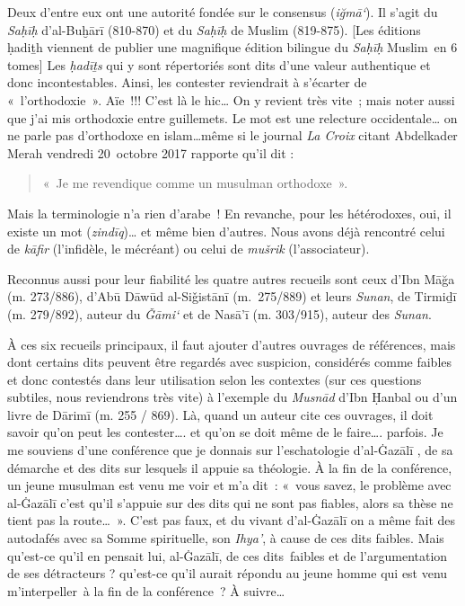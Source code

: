 Deux d'entre eux ont une autorité fondée sur le consensus
(\emph{iğmā`}). Il s'agit du \emph{Saḥīḥ} d'al-Buḫārī (810-870) et du
\emph{Saḥīḥ} de Muslim (819-875). {[}Les éditions ḥadiṯh viennent de
publier une magnifique édition bilingue du \emph{Saḥīḥ} Muslim~en 6
tomes{]} Les \emph{ḥadīṯs} qui y sont répertoriés sont dits d'une valeur
authentique et donc incontestables. Ainsi, les contester reviendrait à
s'écarter de «~l'orthodoxie~». Aïe~!!! C'est là le hic\ldots{} On y
revient très vite~; mais noter aussi que j'ai mis orthodoxie entre
guillemets. Le mot est une relecture occidentale\ldots{} on ne parle pas
d'orthodoxe en islam\ldots même si le journal \emph{La Croix} citant
Abdelkader Merah vendredi 20~octobre 2017 rapporte qu'il dit :
\begin{quote}
    «~Je me revendique comme un musulman orthodoxe~».
\end{quote}
 Mais la
terminologie n'a rien d'arabe~! En revanche, pour les hétérodoxes, oui,
il existe un mot (\emph{zindīq})\ldots{} et même bien d'autres. Nous
avons déjà rencontré celui de \emph{kāfir} (l'infidèle, le mécréant) ou
celui de \emph{mušrik} (l'associateur).

Reconnus aussi pour leur fiabilité les quatre autres recueils sont ceux
d'Ibn Māğa (m. 273/886), d'Abū Dāwūd al-Siǧistānī (m.~275/889) et leurs
\emph{Sunan}, de Tirmiḏī (m. 279/892), auteur du \emph{Ǧāmi`} et de
Nasā'ī (m. 303/915), auteur des \emph{Sunan}.

À ces six recueils principaux, il faut ajouter d'autres ouvrages de
références, mais dont certains dits peuvent être regardés avec
suspicion, considérés comme faibles et donc contestés dans leur
utilisation selon les contextes (sur ces questions subtiles, nous
reviendrons très vite) à l'exemple du \emph{Musnād} d'Ibn Ḥanbal ou d'un
livre de Dārimī (m. 255 / 869). Là, quand un auteur cite ces ouvrages,
il doit savoir qu'on peut les contester\ldots. et qu'on se doit même de
le faire\ldots. parfois. Je me souviens d'une conférence que je donnais
sur l'eschatologie d'al-Ġazālī \label{theol:AlGazali17}, de sa démarche et des dits sur lesquels
il appuie sa théologie. À la fin de la conférence, un jeune musulman est
venu me voir et m'a dit~: «~vous savez, le problème avec al-Ġazālī c'est
qu'il s'appuie sur des dits qui ne sont pas fiables, alors sa thèse ne
tient pas la route\ldots~». C'est pas faux, et du vivant d'al-Ġazālī on
a même fait des autodafés avec sa Somme spirituelle, son \emph{Ihya'}, à
cause de ces dits faibles. Mais qu'est-ce qu'il en pensait lui,
al-Ġazālī, de ces dits~faibles et de l'argumentation de ses détracteurs
? qu'est-ce qu'il aurait répondu au jeune homme qui est venu
m'interpeller~à la fin de la conférence~? À suivre\ldots{}


